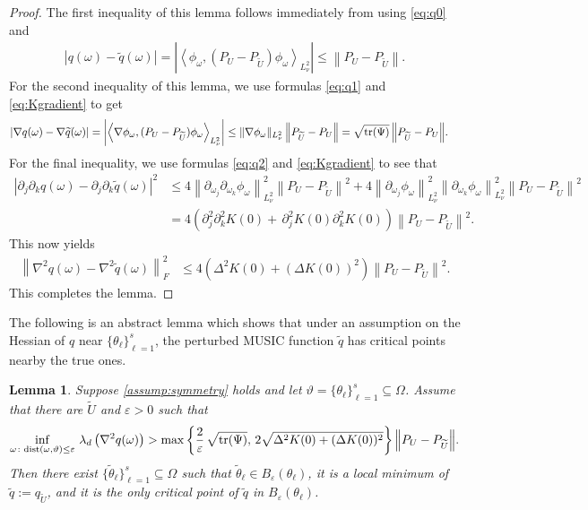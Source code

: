 \documentclass[11pt]{article}
\newtheorem{lemma}[theorem]{Lemma}
\theoremstyle{definition}
\numberwithin{theorem}{section}
\numberwithin{lemma}{section}
\numberwithin{equation}{section}
\renewcommand{\subset}{\subseteq}
\renewcommand{\tilde}{\widetilde}
\renewcommand{\epsilon}{\varepsilon}
\def\dist{{\rm dist}}
\def\trace{{\rm tr}}
\newcommand{\domain}{\Omega}
\newcommand{\norm}[1]{{\left\|#1\right\|}}
\newcommand{\inner}[1]{{\left\langle#1\right\rangle}}
\numberwithin{equation}{section}
\begin{document}
	\begin{proof}
		The first inequality of this lemma follows immediately from using \eqref{eq:q0} and 
		\begin{align*}
			|q(\omega)-\tilde q(\omega)|
			=\left| \inner{\phi_\omega, \left(P_U-P_{\tilde U}\right) \phi_\omega}_{L^2_\nu} \right|
			\leq \norm{P_U-P_{\tilde U}}.
		\end{align*}
		For the second inequality of this lemma, we use formulas \eqref{eq:q1} and \eqref{eq:Kgradient} to get 
		\begin{align*}
			|\nabla q(\omega)-\nabla \tilde q(\omega)|
			&= \left| \inner{\nabla \phi_\omega, (P_U-P_{\tilde U}) \phi_\omega}_{L^2_\nu} \right|
			\leq \|\nabla \phi_\omega\|_{L^2_\nu} \, \norm{P_{\tilde U} -P_U} 
			= \sqrt{\trace(\Psi)} \, \norm{P_{\tilde U} -P_U}.  
		\end{align*}
		For the final inequality, we use formulas \eqref{eq:q2} and \eqref{eq:Kgradient} to see that
		\begin{align*}
			|\partial_j\partial_k q(\omega) - \partial_j\partial_k \tilde q(\omega)|^2
			&\leq 4 \norm{\partial_{\omega_j} \partial_{\omega_k} \phi_\omega}_{L^2_\nu}^2 \norm{P_U-P_{\tilde U}}^2 + 4 \norm{\partial_{\omega_j} \phi_\omega}_{L^2_\nu}^2 \norm{\partial_{\omega_k} \phi_\omega}_{L^2_\nu}^2 \norm{P_U-P_{\tilde U}}^2 \\
			&= 4 \left( \partial_j^2 \partial_k^2 K(0) + \, \partial_j^2 K(0) \partial_k^2 K(0) \right) \norm{P_U-P_{\tilde U}}^2.
		\end{align*}
		This now yields
		\begin{align*}
			\norm{\nabla^2 q(\omega)-\nabla^2 \tilde q(\omega)}_F^2
			&\leq 4 \left( \Delta^2 K(0) + (\Delta K(0))^2 \right) \norm{P_U-P_{\tilde U}}^2.
		\end{align*}
		This completes the lemma.
	\end{proof}
	
	The following is an abstract lemma which shows that under an assumption on the Hessian of $q$ near $\{\theta_\ell\}_{\ell=1}^s$, the perturbed MUSIC function $\tilde q$ has critical points nearby the true ones. 
	
	\begin{lemma}\label{lem:existenceminima}
		Suppose \cref{assump:symmetry} holds and let $\vartheta=\{\theta_\ell\}_{\ell=1}^s \subset \Omega$. Assume that there are $\tilde U$ and $\epsilon >0$ such that 
		\begin{equation}\label{eq:eigcond}
			\inf_{\omega \colon \dist(\omega,\vartheta)\leq \epsilon} \, \lambda_d \left(\nabla^2 q(\omega)\right) 
			> \max\left\{ \frac {2}\epsilon \, \sqrt{\trace(\Psi)}, \, 2 \sqrt{ \Delta^2 K(0) + (\Delta K(0))^2} \right\} \norm{P_U-P_{\tilde U}}.
		\end{equation}
		Then there exist $\{\tilde \theta_\ell\}_{\ell=1}^s \subset \domain$ such that $\tilde \theta_\ell \in B_\epsilon(\theta_\ell)$, it is a local minimum of $\tilde q:=q_{\tilde U}$, and it is the only critical point of $\tilde q$ in $B_\epsilon(\theta_\ell)$.
	\end{lemma}
	
\end{document}
